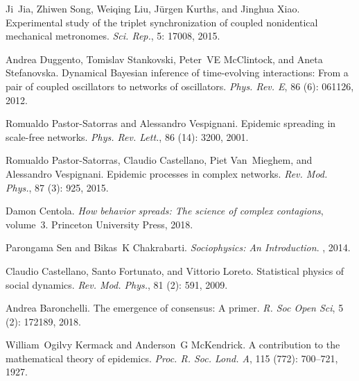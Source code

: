 Ji~Jia, Zhiwen Song, Weiqing Liu, J{\"u}rgen Kurths, and Jinghua Xiao.
\newblock Experimental study of the triplet synchronization of coupled
nonidentical mechanical metronomes.
\newblock \emph{Sci. Rep.}, 5: 17008, 2015.

Andrea Duggento, Tomislav Stankovski, Peter~VE McClintock, and Aneta
Stefanovska.
\newblock Dynamical {{Bayesian}} inference of time-evolving interactions:
{{From}} a pair of coupled oscillators to networks of oscillators.
\newblock \emph{Phys. Rev. E}, 86 (6): 061126, 2012.

Romualdo {Pastor-Satorras} and Alessandro Vespignani.
\newblock Epidemic spreading in scale-free networks.
\newblock \emph{Phys. Rev. Lett.}, 86 (14): 3200, 2001.

Romualdo {Pastor-Satorras}, Claudio Castellano, Piet Van~Mieghem, and
Alessandro Vespignani.
\newblock Epidemic processes in complex networks.
\newblock \emph{Rev. Mod. Phys.}, 87 (3): 925, 2015.

Damon Centola.
\newblock \emph{How behavior spreads: The science of complex contagions},
volume~3.
\newblock Princeton University Press, 2018.

Parongama Sen and Bikas~K Chakrabarti.
\newblock \emph{Sociophysics: An Introduction}.
, 2014.

Claudio Castellano, Santo Fortunato, and Vittorio Loreto.
\newblock Statistical physics of social dynamics.
\newblock \emph{Rev. Mod. Phys.}, 81 (2): 591, 2009.

Andrea Baronchelli.
\newblock The emergence of consensus: A primer.
\newblock \emph{R. Soc Open Sci}, 5 (2): 172189, 2018.

William~Ogilvy Kermack and Anderson~G McKendrick.
\newblock A contribution to the mathematical theory of epidemics.
\newblock \emph{Proc. R. Soc. Lond. A}, 115 (772): 700--721,
1927.

